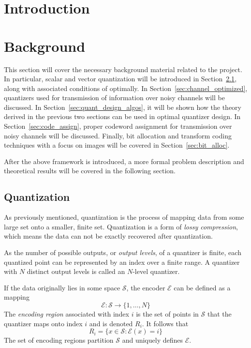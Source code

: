 \section{Introduction}

\section{Background}
This section will cover the necessary background material related to the project. In particular, scalar and vector quantization will be introduced in Section~\ref{sec:quantization}, along with associated conditions of optimally. In Section~\ref{sec:channel_optimized}, quantizers used for transmission of information over noisy channels will be discussed. In Section~\ref{sec:quant_design_algos}, it will be shown how the theory derived in the previous two sections can be used in optimal quantizer design. In Section~\ref{sec:code_assign}, proper codeword assignment for transmission over noisy channels will be discussed. Finally, bit allocation and transform coding techniques with a focus on images will be covered in Section~\ref{sec:bit_alloc}.

After the above framework is introduced, a more formal problem description and theoretical results will be covered in the following section.
\subsection{Quantization}
\label{sec:quantization}
As previously mentioned, quantization is the process of mapping data from some large set onto a smaller, finite set. Quantization is a form of \emph{lossy compression}, which means the data can not be exactly recovered after quantization.

As the number of possible outputs, or \emph{output levels}, of a quantizer is finite, each quantized point can be represented by an index over a finite range. A quantizer with $N$ distinct output levels is called an $N$-level quantizer. 

If the data originally lies in some space $\mathcal{S}$, the encoder $\mathcal{E}$ can be defined as a mapping
\begin{equation}
\mathcal{E} : \mathcal{S} \rightarrow \{1,\ldots,N\}
\end{equation}
The \emph{encoding region} associated with index $i$ is the set of points in $\mathcal{S}$ that the quantizer maps onto index $i$ and is denoted $R_i$. It follows that
\begin{equation}
R_i = \{x \in \mathcal{S} : \mathcal{E}(x) = i\}
\end{equation}
The set of encoding regions partition $\mathcal{S}$ and uniquely defines $\mathcal{E}$.


